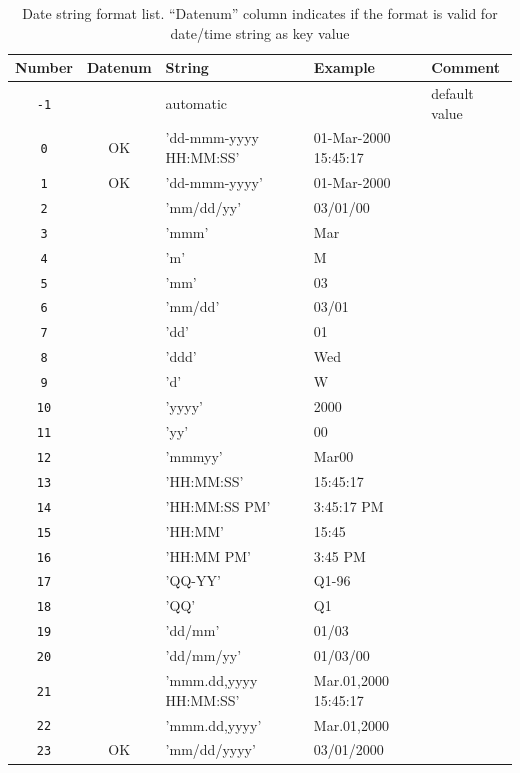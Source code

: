 \begin{table}[htp]
\caption{Date string format list. ``Datenum'' column indicates if the format is valid for date/time string as key value}
\begin{center}
\begin{tabular}{|c|c|l|l|l|}
\hline
\textbf{Number} & \textbf{Datenum} & \textbf{String} & \textbf{Example} & \textbf{Comment}\\
\hline
\texttt{-1}		&		& automatic					&	& default value\\
\texttt{0}		& OK	& 'dd-mmm-yyyy HH:MM:SS'	& 01-Mar-2000 15:45:17	&\\
\texttt{1}		& OK	& 'dd-mmm-yyyy'				& 01-Mar-2000	&\\
\texttt{2}		&		& 'mm/dd/yy'				& 03/01/00	&\\
\texttt{3}		&		& 'mmm'						& Mar	&\\
\texttt{4}		&		& 'm'						& M	&\\
\texttt{5}		&		& 'mm'						& 03	&\\
\texttt{6}		&		& 'mm/dd'					& 03/01	&\\
\texttt{7}		&		& 'dd'						& 01	&\\
\texttt{8}		&		& 'ddd'						& Wed	&\\
\texttt{9}		&		& 'd'						& W	&\\
\texttt{10}		&		& 'yyyy'					& 2000	&\\
\texttt{11}		&		& 'yy'						& 00	&\\
\texttt{12}		&		& 'mmmyy'					& Mar00	&\\
\texttt{13}		&		& 'HH:MM:SS'				& 15:45:17	&\\
\texttt{14}		&		& 'HH:MM:SS PM'				& 3:45:17 PM	&\\
\texttt{15}		&		& 'HH:MM'					& 15:45	&\\
\texttt{16}		&		& 'HH:MM PM'				& 3:45 PM	&\\
\texttt{17}		&		& 'QQ-YY'					& Q1-96	&\\
\texttt{18}		&		& 'QQ'						& Q1	&\\
\texttt{19}		&		& 'dd/mm'					& 01/03	&\\
\texttt{20}		&		& 'dd/mm/yy'				& 01/03/00	&\\
\texttt{21}		&		& 'mmm.dd,yyyy HH:MM:SS'	& Mar.01,2000 15:45:17	&\\
\texttt{22}		&		& 'mmm.dd,yyyy'				& Mar.01,2000	&\\
\texttt{23}		& OK	& 'mm/dd/yyyy'				& 03/01/2000	&\\

\end{tabular}
\end{center}
\end{table}
